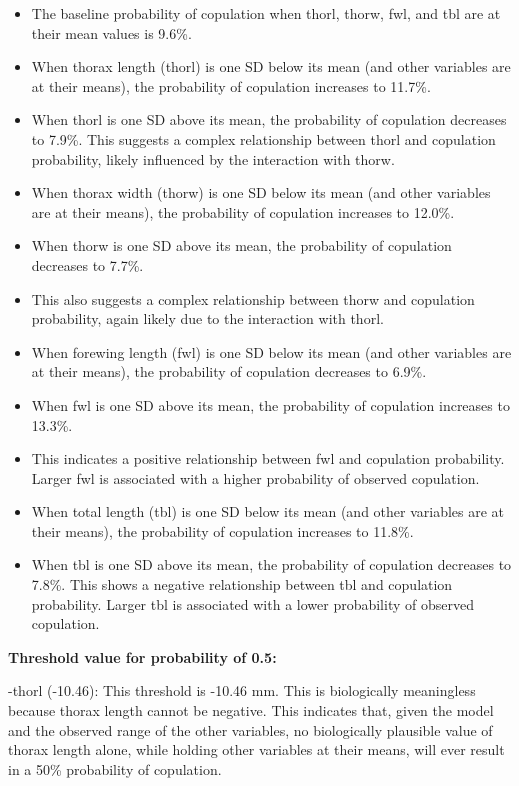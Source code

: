 \documentclass[
]{article}
\providecommand{\tightlist}{%
  \setlength{\itemsep}{0pt}\setlength{\parskip}{0pt}}
\begin{document}
\begin{itemize}
\tightlist
\item
  The baseline probability of copulation when thorl, thorw, fwl, and tbl
  are at their mean values is 9.6\%.
\item
  When thorax length (thorl) is one SD below its mean (and other
  variables are at their means), the probability of copulation increases
  to 11.7\%.
\item
  When thorl is one SD above its mean, the probability of copulation
  decreases to 7.9\%. This suggests a complex relationship between thorl
  and copulation probability, likely influenced by the interaction with
  thorw.
\item
  When thorax width (thorw) is one SD below its mean (and other
  variables are at their means), the probability of copulation increases
  to 12.0\%.
\item
  When thorw is one SD above its mean, the probability of copulation
  decreases to 7.7\%.
\item
  This also suggests a complex relationship between thorw and copulation
  probability, again likely due to the interaction with thorl.
\item
  When forewing length (fwl) is one SD below its mean (and other
  variables are at their means), the probability of copulation decreases
  to 6.9\%.
\item
  When fwl is one SD above its mean, the probability of copulation
  increases to 13.3\%.
\item
  This indicates a positive relationship between fwl and copulation
  probability. Larger fwl is associated with a higher probability of
  observed copulation.
\item
  When total length (tbl) is one SD below its mean (and other variables
  are at their means), the probability of copulation increases to
  11.8\%.
\item
  When tbl is one SD above its mean, the probability of copulation
  decreases to 7.8\%. This shows a negative relationship between tbl and
  copulation probability. Larger tbl is associated with a lower
  probability of observed copulation.
\end{itemize}

\textbf{Threshold value for probability of 0.5:}

-thorl (-10.46): This threshold is -10.46 mm. This is biologically
meaningless because thorax length cannot be negative. This indicates
that, given the model and the observed range of the other variables, no
biologically plausible value of thorax length alone, while holding other
variables at their means, will ever result in a 50\% probability of
copulation.
\end{document}
